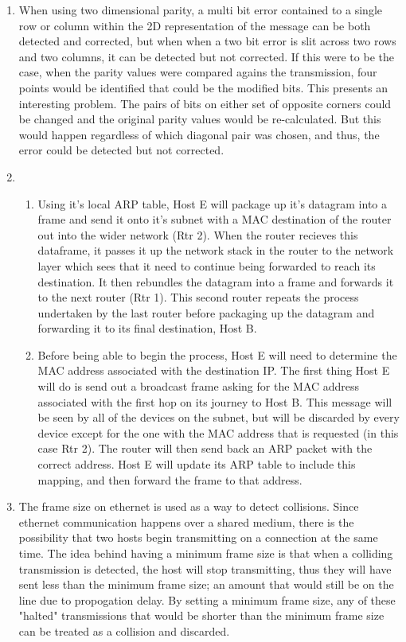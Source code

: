 


\begin{enumerate}
    \item When using two dimensional parity, a multi bit error contained to a single row or column within the 2D representation of the message can be both detected and corrected, but when when a two bit error is slit across two rows and two columns, it can be detected but not corrected. If this were to be the case, when the parity values were compared agains the transmission, four points would be identified that could be the modified bits. This presents an interesting problem. The pairs of bits on either set of opposite corners could be changed and the original parity values would be re-calculated. But this would happen regardless of which diagonal pair was chosen, and thus, the error could be detected but not corrected.

    \item
    \begin{enumerate}
        \item Using it's local ARP table, Host E will package up it's datagram into a frame and send it onto it's subnet with a MAC destination of the router out into the wider network (Rtr 2). When the router recieves this dataframe, it passes it up the network stack in the router to the network layer which sees that it need to continue being forwarded to reach its destination. It then rebundles the datagram into a frame and forwards it to the next router (Rtr 1). This second router repeats the process undertaken by the last router before packaging up the datagram and forwarding it to its final destination, Host B.

        \item Before being able to begin the process, Host E will need to determine the MAC address associated with the destination IP. The first thing Host E will do is send out a broadcast frame asking for the MAC address associated with the first hop on its journey to Host B. This message will be seen by all of the devices on the subnet, but will be discarded by every device except for the one with the MAC address that is requested (in this case Rtr 2). The router will then send back an ARP packet with the correct address. Host E will update its ARP table to include this mapping, and then forward the frame to that address.
    \end{enumerate}

    \item The frame size on ethernet is used as a way to detect collisions. Since ethernet communication happens over a shared medium, there is the possibility that two hosts begin transmitting on a connection at the same time. The idea behind having a minimum frame size is that when a colliding transmission is detected, the host will stop transmitting, thus they will have sent less than the minimum frame size; an amount that would still be on the line due to propogation delay. By setting a minimum frame size, any of these "halted" transmissions that would be shorter than the minimum frame size can be treated as a collision and discarded.


\end{enumerate}
